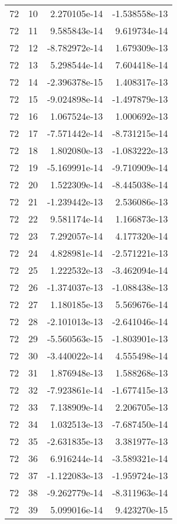 \begin{tabular}{rrrr}
  72 &   10 &  2.270105e-14 & -1.538558e-13 \\
  72 &   11 &  9.585843e-14 &  9.619734e-14 \\
  72 &   12 & -8.782972e-14 &  1.679309e-13 \\
  72 &   13 &  5.298544e-14 &  7.604418e-14 \\
  72 &   14 & -2.396378e-15 &  1.408317e-13 \\
  72 &   15 & -9.024898e-14 & -1.497879e-13 \\
  72 &   16 &  1.067524e-13 &  1.000692e-13 \\
  72 &   17 & -7.571442e-14 & -8.731215e-14 \\
  72 &   18 &  1.802080e-13 & -1.083222e-13 \\
  72 &   19 & -5.169991e-14 & -9.710909e-14 \\
  72 &   20 &  1.522309e-14 & -8.445038e-14 \\
  72 &   21 & -1.239442e-13 &  2.536086e-13 \\
  72 &   22 &  9.581174e-14 &  1.166873e-13 \\
  72 &   23 &  7.292057e-14 &  4.177320e-14 \\
  72 &   24 &  4.828981e-14 & -2.571221e-13 \\
  72 &   25 &  1.222532e-13 & -3.462094e-14 \\
  72 &   26 & -1.374037e-13 & -1.088438e-13 \\
  72 &   27 &  1.180185e-13 &  5.569676e-14 \\
  72 &   28 & -2.101013e-13 & -2.641046e-14 \\
  72 &   29 & -5.560563e-15 & -1.803901e-13 \\
  72 &   30 & -3.440022e-14 &  4.555498e-14 \\
  72 &   31 &  1.876948e-13 &  1.588268e-13 \\
  72 &   32 & -7.923861e-14 & -1.677415e-13 \\
  72 &   33 &  7.138909e-14 &  2.206705e-13 \\
  72 &   34 &  1.032513e-13 & -7.687450e-14 \\
  72 &   35 & -2.631835e-13 &  3.381977e-13 \\
  72 &   36 &  6.916244e-14 & -3.589321e-14 \\
  72 &   37 & -1.122083e-13 & -1.959724e-13 \\
  72 &   38 & -9.262779e-14 & -8.311963e-14 \\
  72 &   39 &  5.099016e-14 &  9.423270e-15 \\

\end{tabular}
